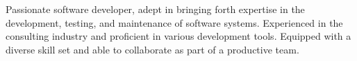 

\begin{cvparagraph}

Passionate software developer, adept in bringing forth expertise in the development, testing, and maintenance of software systems. Experienced in the consulting industry and proficient in various development tools. Equipped with a diverse skill set and able to collaborate as part of a productive team.
\end{cvparagraph}
